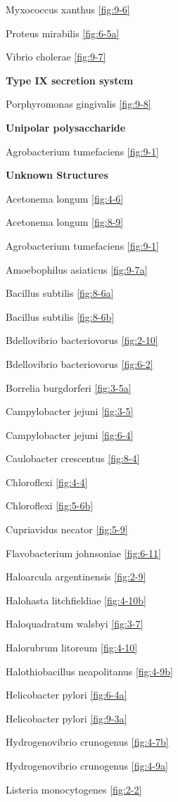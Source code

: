 \documentclass[]{tufte-book}
\begin{document}
Myxococcus xanthus \ref{fig:9-6}

Proteus mirabilis \ref{fig:6-5a}

Vibrio cholerae \ref{fig:9-7}

\textbf{Type IX secretion system}

Porphyromonas gingivalis \ref{fig:9-8}

\textbf{Unipolar polysaccharide}

Agrobacterium tumefaciens \ref{fig:9-1}

\textbf{Unknown Structures}

Acetonema longum \ref{fig:4-6}

Acetonema longum \ref{fig:8-9}

Agrobacterium tumefaciens \ref{fig:9-1}

Amoebophilus asiaticus \ref{fig:9-7a}

Bacillus subtilis \ref{fig:8-6a}

Bacillus subtilis \ref{fig:8-6b}

Bdellovibrio bacteriovorus \ref{fig:2-10}

Bdellovibrio bacteriovorus \ref{fig:6-2}

Borrelia burgdorferi \ref{fig:3-5a}

Campylobacter jejuni \ref{fig:3-5}

Campylobacter jejuni \ref{fig:6-4}

Caulobacter crescentus \ref{fig:8-4}

Chloroflexi \ref{fig:4-4}

Chloroflexi \ref{fig:5-6b}

Cupriavidus necator \ref{fig:5-9}

Flavobacterium johnsoniae \ref{fig:6-11}

Haloarcula argentinensis \ref{fig:2-9}

Halohasta litchfieldiae \ref{fig:4-10b}

Haloquadratum walsbyi \ref{fig:3-7}

Halorubrum litoreum \ref{fig:4-10}

Halothiobacillus neapolitanus \ref{fig:4-9b}

Helicobacter pylori \ref{fig:6-4a}

Helicobacter pylori \ref{fig:9-3a}

Hydrogenovibrio crunogenus \ref{fig:4-7b}

Hydrogenovibrio crunogenus \ref{fig:4-9a}

Listeria monocytogenes \ref{fig:2-2}
\end{document}
